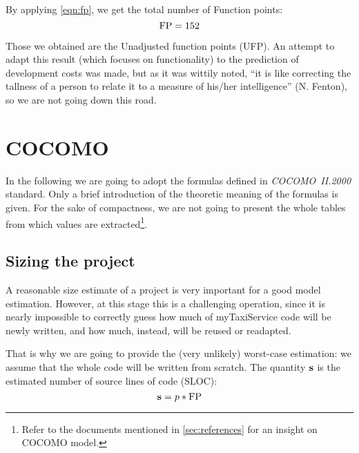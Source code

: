 By applying \cref{eqn:fp}, we get the total number of Function points:
\begin{equation}
	\text{FP} = 152
\end{equation}

Those we obtained are the Unadjusted function points (UFP). An attempt to adapt this result (which focuses on functionality) to the prediction of development costs was made, but as it was wittily noted, ``it is like correcting the tallness of a person to relate it to a measure of his/her intelligence'' (N. Fenton), so we are not going down this road.






















\section{COCOMO}\label{sec:cocomo}

In the following we are going to adopt the formulas defined in \mbox{\emph{COCOMO II.2000}} standard. Only a brief introduction of the theoretic meaning of the formulas is given. For the sake of compactness, we are not going to present the whole tables from which values are extracted\footnote{Refer to the documents mentioned in \cref{sec:references} for an insight on COCOMO model.}.  


\subsection{Sizing the project}

A reasonable size estimate of a project is very important for a good model estimation. However, at this stage this is a challenging operation, since it is nearly impossible to correctly guess how much of myTaxiService code will be newly written, and how much, instead, will be reused or readapted.

That is why we are going to provide the (very unlikely) worst-case estimation: we assume that the whole code will be written from scratch. The quantity $\mathbf{s}$ is the estimated number of source lines of code (SLOC):
\begin{equation}
%
	\mSize = p * \mFP
%
\end{equation}


